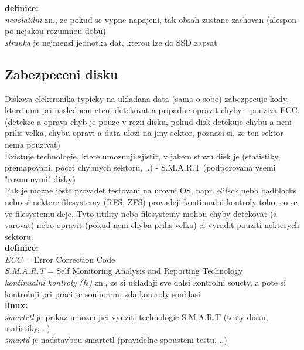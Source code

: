 \documentclass[a4paper, 11pt]{article}
\begin{document}
\noindent\textbf{definice:} \\[0.5em]
\textit{nevolatilni} zn., ze pokud se vypne napajeni, tak obsah zustane zachovan (alespon po nejakou rozumnou dobu) \\[0.2em]
\textit{stranka} je nejmensi jednotka dat, kterou lze do SSD zapsat \\

\subsection{Zabezpeceni disku}
Diskova elektronika typicky na ukladana data (sama o sobe) zabezpecuje kody, ktere umi pri naslednem cteni detekovat a pripadne opravit chyby - pouziva ECC. (detekce a oprava chyb je pouze v rezii disku, pokud disk detekuje chybu a neni prilis velka, chybu opravi a data ulozi na jiny sektor, poznaci si, ze ten sektor nema pouzivat) \\

\noindent Existuje technologie, ktere umoznuji zjistit, v jakem stavu disk je (statistiky, premapovani, pocet chybnych sektoru, ..) - S.M.A.R.T (podporovana vsemi "rozumnymi" disky) \\

\noindent Pak je mozne jeste provadet testovani na urovni OS, napr. e2fsck nebo badblocks nebo si nektere filesystemy (RFS, ZFS) provadeji kontinualni kontroly toho, co se ve filesystemu deje. Tyto utility nebo filesystemy mohou chyby detekovat (a varovat) nebo opravit (pokud neni chyba prilis velka) ci vyradit pouziti nekterych sektoru. \\


\noindent\textbf{definice:} \\[0.5em]
\textit{ECC} = Error Correction Code \\[0.2em]
\textit{S.M.A.R.T} = Self Monitoring Analysis and Reporting Technology \\[0.2em]
\textit{kontinualni kontroly (fs)} zn., ze si ukladaji sve dalsi kontrolni soucty, a pote si kontroluji pri praci se souborem, zda kontroly souhlasi \\

\noindent\textbf{linux:} \\[0.5em]
\textit{smartctl} je prikaz umoznujici vyuziti technologie S.M.A.R.T (testy disku, statistiky, ..) \\[0.2em]
\textit{smartd} je nadstavbou smartctl (pravidelne spousteni testu, ..)

\newpage
\end{document}
